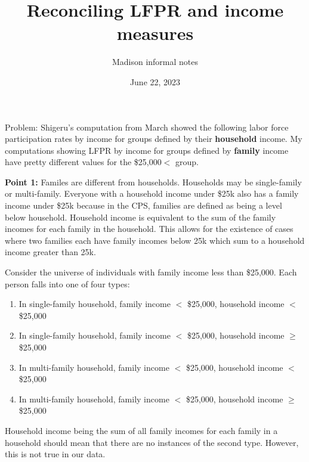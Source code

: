 \documentclass{article}
\title{Reconciling LFPR and income measures}
\author{Madison informal notes}
\date{June 22, 2023}
\begin{document}
 
	\maketitle
	
Problem: Shigeru's computation from March showed the following labor force participation rates by income for groups defined by their \textbf{household} income. My computations showing LFPR by income for groups defined by \textbf{family} income have pretty different values for the \$25,000$<$ group. 

\textbf{Point 1:} Familes are different from households. Households may be single-family or multi-family. Everyone with a household income under \$25k also has a family income under \$25k because in the CPS, families are defined as being a level below household. Household income is equivalent to the sum of the family incomes for each family in the household. This allows for the existence of cases where two families each have family incomes below 25k which sum to a household income greater than 25k. 

Consider the universe of individuals with family income less than \$25,000. Each person falls into one of four types:

	\begin{enumerate}
		\item In single-family household, family income $<$ \$25,000, household income $<$ \$25,000 
		\item In single-family household, family income $<$ \$25,000, household income $\ge$ \$25,000 
		\item In multi-family household, family income $<$ \$25,000, household income $<$ \$25,000
		\item In multi-family household, family income $<$ \$25,000, household income $\ge$ \$25,000
		\end{enumerate}

 Household income being the sum of all family incomes for each family in a household should mean that there are no instances of the second type. However, this is not true in our data.
\end{document}
